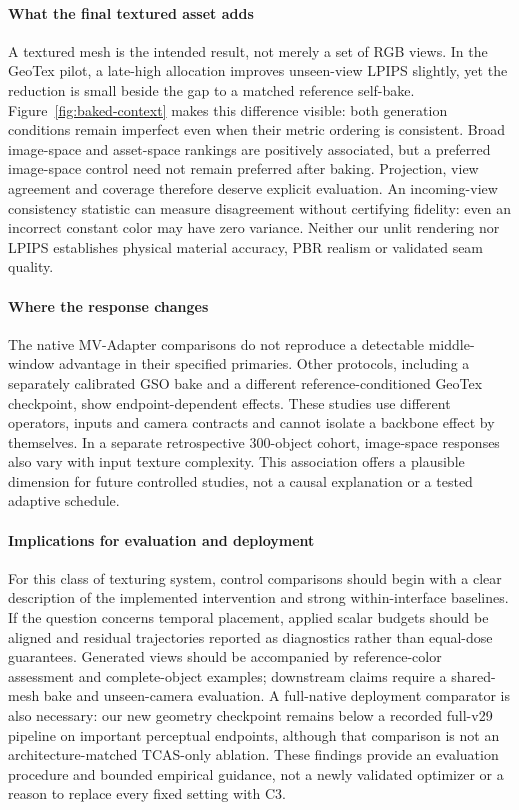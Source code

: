 \documentclass[times,twocolumn,final]{elsarticle}
\begin{document}
\paragraph{What the final textured asset adds}
A textured mesh is the intended result, not merely a set of RGB views. In the GeoTex pilot, a late-high allocation improves unseen-view LPIPS slightly, yet the reduction is small beside the gap to a matched reference self-bake. Figure~\ref{fig:baked-context} makes this difference visible: both generation conditions remain imperfect even when their metric ordering is consistent. Broad image-space and asset-space rankings are positively associated, but a preferred image-space control need not remain preferred after baking. Projection, view agreement and coverage therefore deserve explicit evaluation. An incoming-view consistency statistic can measure disagreement without certifying fidelity: even an incorrect constant color may have zero variance. Neither our unlit rendering nor LPIPS establishes physical material accuracy, PBR realism or validated seam quality.

\paragraph{Where the response changes}
The native MV-Adapter comparisons do not reproduce a detectable middle-window advantage in their specified primaries. Other protocols, including a separately calibrated GSO bake and a different reference-conditioned GeoTex checkpoint, show endpoint-dependent effects. These studies use different operators, inputs and camera contracts and cannot isolate a backbone effect by themselves. In a separate retrospective 300-object cohort, image-space responses also vary with input texture complexity. This association offers a plausible dimension for future controlled studies, not a causal explanation or a tested adaptive schedule.

\paragraph{Implications for evaluation and deployment}
For this class of texturing system, control comparisons should begin with a clear description of the implemented intervention and strong within-interface baselines. If the question concerns temporal placement, applied scalar budgets should be aligned and residual trajectories reported as diagnostics rather than equal-dose guarantees. Generated views should be accompanied by reference-color assessment and complete-object examples; downstream claims require a shared-mesh bake and unseen-camera evaluation. A full-native deployment comparator is also necessary: our new geometry checkpoint remains below a recorded full-v29 pipeline on important perceptual endpoints, although that comparison is not an architecture-matched TCAS-only ablation. These findings provide an evaluation procedure and bounded empirical guidance, not a newly validated optimizer or a reason to replace every fixed setting with C3.
\end{document}

